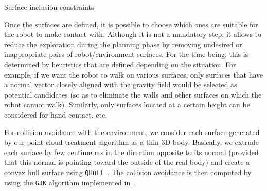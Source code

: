 \begin{algorithm}
\caption{Surface inclusion constraints}
\label{alg:surf_inclusion}
\begin{algorithmic}
\EndFor{}
\EndFor{}
\end{algorithmic}
\end{algorithm}

Once the surfaces are defined, it is possible to choose which ones are suitable for the robot to make contact with.
Although it is not a mandatory step, it allows to reduce the exploration during the planning phase by removing undesired or inappropriate pairs of robot/environment surfaces.
For the time being, this is determined by heuristics that are defined depending on the situation.
For example, if we want the robot to walk on various surfaces, only surfaces that have a normal vector closely aligned with the gravity field would be selected as potential candidates (so as to eliminate the walls and other surfaces on which the robot cannot walk).
Similarly, only surfaces located at a certain height can be considered for hand contact, etc.

For collision avoidance with the environment, we consider each surface generated by our point cloud treatment algorithm as a thin 3D body.
Basically, we extrude each surface by few centimetres in the direction opposite to its normal (provided that this normal is pointing toward the outside of the real body) and create a convex hull surface using {\tt QHull}~\cite{qhull:acm:1996}.
The collision avoidance is then computed by using the {\tt GJK} algorithm implemented in~\cite{benallegue:icra:2009}.
